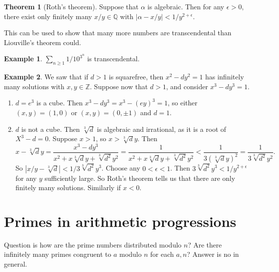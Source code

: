 \documentclass{article}
\newcommand{\Z}{\mathbb{Z}}
\newcommand{\Q}{\mathbb{Q}}
\newcommand{\rb}[1]{\left( #1 \right)}
\newcommand{\abs}[1]{\left\lvert #1 \right\rvert}
\theoremstyle{definition}\newtheorem{definition}{Definition}
\theoremstyle{definition}\newtheorem{remark}[definition]{Remark}
\theoremstyle{definition}\newtheorem*{example}{Example}
\theoremstyle{definition}\newtheorem*{note}{Note}
\newtheorem{theorem}[definition]{Theorem}
\begin{document}

\begin{theorem}[Roth's theorem]
Suppose that $ \alpha $ is algebraic. Then for any $ \epsilon > 0 $, there exist only finitely many $ x / y \in \Q $ with $ \abs{\alpha - x / y} < 1 / y^{2 + \epsilon} $.
\end{theorem}

This can be used to show that many more numbers are transcendental than Liouville's theorem could.

\begin{example}
$ \sum_{n \ge 1} 1 / 10^{3^n} $ is transcendental.
\end{example}

\begin{example}
We saw that if $ d > 1 $ is squarefree, then $ x^2 - dy^2 = 1 $ has infinitely many solutions with $ x, y \in \Z $. Suppose now that $ d > 1 $, and consider $ x^3 - dy^3 = 1 $.
\begin{enumerate}
\item $ d = e^3 $ is a cube. Then $ x^3 - dy^3 = x^3 - \rb{ey}^3 = 1 $, so either $ \rb{x, y} = \rb{1, 0} $ or $ \rb{x, y} = \rb{0, \pm1} $ and $ d = 1 $.
\item $ d $ is not a cube. Then $ \sqrt[3]{d} $ is algebraic and irrational, as it is a root of $ X^3 - d = 0 $. Suppose $ x > 1 $, so $ x > \sqrt[3]{d}y $. Then
$$ x - \sqrt[3]{d}y = \dfrac{x^3 - dy^3}{x^2 + x\sqrt[3]{d}y + \sqrt[3]{d^2}y^2} = \dfrac{1}{x^2 + x\sqrt[3]{d}y + \sqrt[3]{d^2}y^2} < \dfrac{1}{3\rb{\sqrt[3]{d}y}^2} = \dfrac{1}{3\sqrt[3]{d^2}y^2}. $$
So $ \abs{x / y - \sqrt[3]{d}} < 1 / 3\sqrt[3]{d^2}y^3 $. Choose any $ 0 < \epsilon < 1 $. Then $ 3\sqrt[3]{d^2}y^3  < 1 / y^{2 + \epsilon} $ for any $ y $ sufficiently large. So Roth's theorem tells us that there are only finitely many solutions. Similarly if $ x < 0 $.
\end{enumerate}
\end{example}

\section{Primes in arithmetic progressions}

Question is how are the prime numbers distributed modulo $ n $? Are there infinitely many primes congruent to $ a $ modulo $ n $ for each $ a, n $? Answer is no in general.
\end{document}
